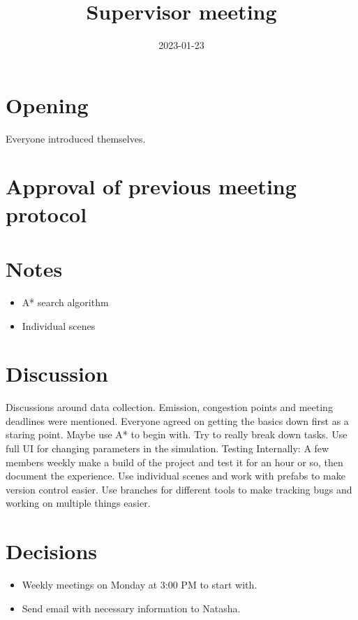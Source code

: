 \documentclass{article}
\newcommand{\meetingdate}{2023-01-23}
\newcommand{\meetingtime}{14:00}
\newcommand{\meetingtitle}{Supervisor meeting}
\newcommand{\attendees}{\martin \and \felix \and \hannes \and \marcus \and \jakob}
\begin{document}
    \begin{titlepage}
        \title{\meetingtitle}
        \date{\meetingdate}
        \maketitle
        
        \thispagestyle{first}
        
        \timeanddate{\meetingdate \space \meetingtime}
        \called{\members}
        \attended{\attendees}
    \end{titlepage}
    \newpage
    \pagestyle{fancy}

    \section{Opening}
        Everyone introduced themselves.

    \section{Approval of previous meeting protocol}
        
    \section{Notes}
        \begin{itemize}
            \item A* search algorithm
            \item Individual scenes
        \end{itemize}

    \section{Discussion}
        Discussions around data collection. Emission, congestion points and meeting deadlines were mentioned. Everyone agreed on getting the basics down first as a staring point. Maybe use A* to begin with. Try to really break down tasks. Use full UI for changing parameters in the simulation. Testing Internally: A few members weekly make a build of the project and test it for an hour or so, then document the experience. Use individual scenes and work with prefabs to make version control easier. Use branches for different tools to make tracking bugs and working on multiple things easier.

    \section{Decisions}
        \begin{itemize}
            \item Weekly meetings on Monday at 3:00 PM to start with.
            \item Send email with necessary information to Natasha.
        \end{itemize} 
    
\end{document}
